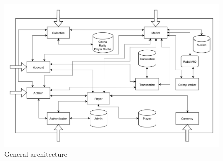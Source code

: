 \documentclass{article}
\begin{document}
\begin{figure}[ht]
    \centering
    \includegraphics[width=12cm]{img/architecture/architecture-v2.drawio.png}
    \caption{General architecture}
    \label{fig:general_architecture}
\end{figure}
\end{document}
